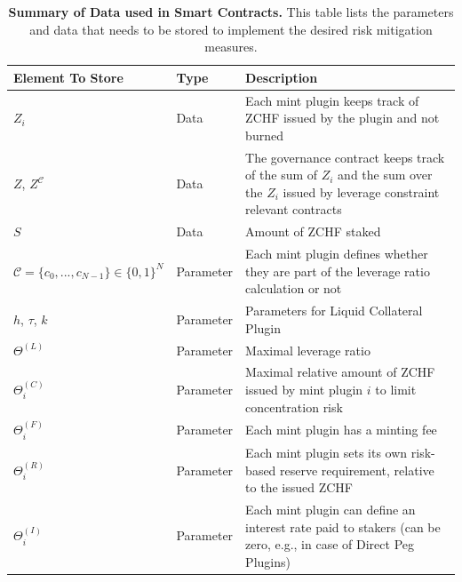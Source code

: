 \documentclass[english,11pt]{article}
\begin{document}
\begin{table}[htbp]
 \caption{\textbf{Summary of Data used in Smart Contracts.}
    This table lists the parameters and data that needs to
    be stored to implement the desired risk mitigation measures.} %
    \centering %
\begin{tabularx}{\textwidth}{llX}
\toprule
Element To Store & Type & Description \\
\midrule
$Z_i$                        & Data          & Each mint plugin keeps track of ZCHF issued by the plugin and not burned                                     \\
$Z$, $Z^{\mathcal{C}}$ & Data          & The governance contract keeps track of the sum of $Z_i$ and the sum over the $Z_i$ issued by leverage constraint relevant contracts\\
$S$                         & Data          & Amount of ZCHF staked                                                                                        \\
$\mathcal{C}=\{c_0, ...,c_{N-1}\} \in \{0,1\}^N$               & Parameter     & Each mint plugin defines whether they are part of the leverage ratio calculation or not                      \\
$h$, $\tau$, $k$                 & Parameter     & Parameters for Liquid Collateral Plugin                                                                    \\
$\Theta^{(L)}$                   & Parameter     & Maximal leverage ratio                                                                                       \\
$\Theta_i^{(C)}$             & Parameter     & Maximal relative amount of ZCHF issued by mint plugin $i$ to limit concentration risk                                                  \\
$\Theta_i^{(F)}$             & Parameter     & Each mint plugin has a minting fee                                                                           \\
$\Theta_i^{(R)}$             & Parameter     & Each mint plugin sets its own risk-based reserve requirement, relative to the issued ZCHF                     \\
$\Theta_i^{(I)}$                        & Parameter     & Each mint plugin can define an interest rate paid to stakers (can be zero, e.g., in case of Direct Peg Plugins)\\
\bottomrule
\end{tabularx}\label{tab:summary}
\end{table}
\end{document}
